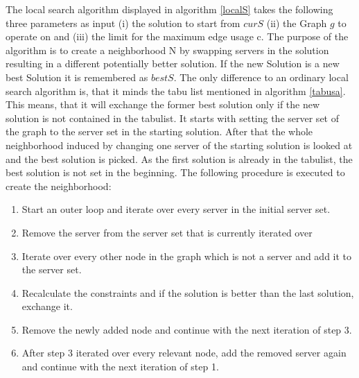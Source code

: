 \documentclass [12pt]{article}
\begin{document}
The local search algorithm displayed in algorithm \ref{localS} takes
the following three parameters as input (i) the solution to start from $curS$
(ii) the Graph $g$ to operate on and (iii) the limit for the maximum edge usage c.
The purpose of the algorithm is to create a neighborhood N by swapping servers in the solution
resulting in a different potentially better solution. If the new Solution is a new best Solution it is remembered as $bestS$.
The only difference to an ordinary local search algorithm is, that it minds the tabu list mentioned in algorithm \ref{tabusa}.
This means, that it will exchange the former best solution only if the new solution is not contained in the tabulist.
It starts with setting the server set of the graph to the server set in the starting solution. After that the whole
neighborhood induced by changing one server of the starting solution is looked at and the best solution is picked. As the first solution
is already in the tabulist, the best solution is not set in the beginning.
The following procedure is executed to create the neighborhood:
\begin{enumerate}
  \item{Start an outer loop and iterate over every server in the initial server set.}
  \item{Remove the server from the server set that is currently iterated over}
  \item{Iterate over every other node in the graph which is not a server and add it to the server set.}
  \item{Recalculate the constraints and if the solution is better than the last solution, exchange it.}
  \item{Remove the newly added node and continue with the next iteration of step 3.}
  \item{After step 3 iterated over every relevant node, add the removed server again and continue with the next iteration of step 1.}
\end{enumerate}
\end{document}
